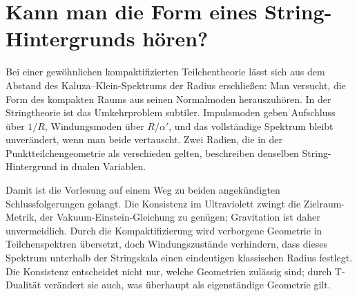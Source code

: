 \begin{classroomqa}
\end{classroomqa}

\section{Kann man die Form eines String-Hintergrunds hören?}

Bei einer gewöhnlichen kompaktifizierten Teilchentheorie lässt sich aus dem Abstand des Kaluza--Klein-Spektrums der Radius erschließen: Man versucht, die Form des kompakten Raums aus seinen Normalmoden herauszuhören. In der Stringtheorie ist das Umkehrproblem subtiler. Impulsmoden geben Aufschluss über \(1/R\), Windungsmoden über \(R/\alpha'\), und das vollständige Spektrum bleibt unverändert, wenn man beide vertauscht. Zwei Radien, die in der Punktteilchengeometrie als verschieden gelten, beschreiben denselben String-Hintergrund in dualen Variablen.

Damit ist die Vorlesung auf einem Weg zu beiden angekündigten Schlussfolgerungen gelangt. Die Konsistenz im Ultraviolett zwingt die Zielraum-Metrik, der Vakuum-Einstein-Gleichung zu genügen; Gravitation ist daher unvermeidlich. Durch die Kompaktifizierung wird verborgene Geometrie in Teilchenspektren übersetzt, doch Windungszustände verhindern, dass dieses Spektrum unterhalb der Stringskala einen eindeutigen klassischen Radius festlegt. Die Konsistenz entscheidet nicht nur, welche Geometrien zulässig sind; durch T-Dualität verändert sie auch, was überhaupt als eigenständige Geometrie gilt.